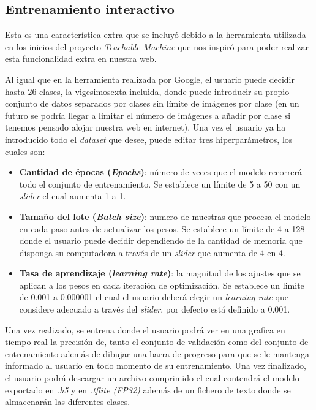 \subsection{\textbf{Entrenamiento interactivo}}
Esta es una característica extra que se incluyó debido a la herramienta utilizada en los inicios del proyecto \textit{Teachable Machine} que nos inspiró para poder realizar esta funcionalidad extra en nuestra web.

Al igual que en la herramienta realizada por Google, el usuario puede decidir hasta  26 clases, la vigesimosexta incluida, donde puede introducir su propio conjunto de datos separados por clases sin límite de imágenes por clase (en un futuro se podría llegar a limitar el número de imágenes a añadir por clase si tenemos pensado alojar nuestra web en internet). Una vez el usuario ya ha introducido todo el \textit{dataset} que desee, puede editar tres hiperparámetros, los cuales son:


\begin{itemize}
\tightlist
    \item \textbf{Cantidad de épocas (\textit{Epochs})}: número de veces que el modelo recorrerá todo el conjunto de entrenamiento. Se establece un límite de 5 a 50 con un \textit{slider} el cual aumenta 1 a 1.
    \item \textbf{Tamaño del lote (\textit{Batch size})}: numero de muestras que procesa el modelo en cada paso antes de actualizar los pesos. Se establece un límite de 4 a 128 donde el usuario puede decidir dependiendo de la cantidad de memoria que disponga su computadora a través de un \textit{slider} que aumenta de 4 en 4.
    \item \textbf{Tasa de aprendizaje (\textit{learning rate})}: la magnitud de los ajustes que se aplican a los pesos en cada iteración de optimización. Se establece un limite de 0.001 a 0.000001 el cual el usuario deberá elegir un \textit{learning rate} que considere adecuado a través del \textit{slider}, por defecto está definido a 0.001.
\end{itemize}

Una vez realizado, se entrena donde el usuario podrá ver en una grafica en tiempo real la precisión de, tanto el conjunto de validación como del conjunto de entrenamiento además de dibujar una barra de progreso para que se le mantenga informado al usuario en todo momento de su entrenamiento. 
Una vez finalizado, el usuario podrá descargar un archivo comprimido el cual contendrá el  modelo exportado en \textit{.h5} y en \textit{.tflite (FP32)} además de un fichero de texto donde se almacenarán las diferentes clases.

